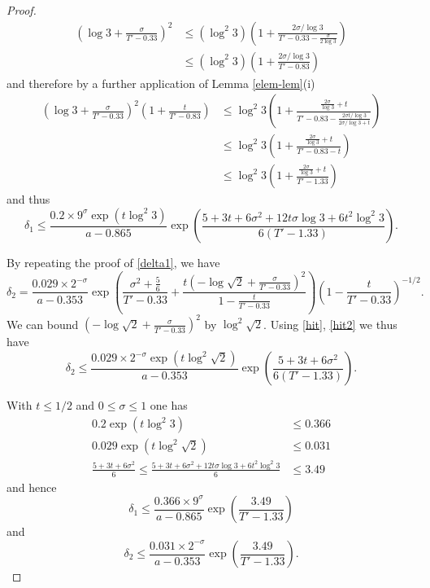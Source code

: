 \begin{proof}
\begin{align*}
\left(\log 3 + \frac{\sigma}{T'-0.33}\right)^2 &\leq (\log^2 3) \left(1 + \frac{2 \sigma / \log 3}{T' - 0.33 - \frac{\sigma}{2\log 3}}\right) \\
&\leq  (\log^2 3) \left(1 + \frac{2 \sigma / \log 3}{T' - 0.83}\right)
\end{align*}
and therefore by a further application of Lemma \ref{elem-lem}(i)
\begin{align*}
\left(\log 3 + \frac{\sigma}{T'-0.33}\right)^2 \left(1 + \frac{t}{T'-0.83}\right) 
&\leq \log^2 3 \left(1 + \frac{\frac{2 \sigma}{\log 3} + t}{T' - 0.83 - \frac{2\sigma t/\log 3}{2\sigma/\log 3 + t}}\right) \\
&\leq \log^2 3 \left(1 + \frac{\frac{2 \sigma}{\log 3} + t}{T' - 0.83 - t}\right) \\
&\leq \log^2 3 \left(1 + \frac{\frac{2 \sigma}{\log 3} + t}{T' - 1.33}\right) 
\end{align*}
and thus
$$ \delta_1 \leq \frac{0.2 \times 9^\sigma \exp( t \log^2 3 )}{a-0.865} \exp\left( \frac{5+3t+6\sigma^2 + 12 t \sigma \log 3 + 6t^2 \log^2 3}{6(T'-1.33)} \right).$$

By repeating the proof of \eqref{delta1}, we have
$$
 \delta_2 = \frac{0.029 \times 2^{-\sigma}}{a - 0.353} \exp\left( \frac{\sigma^2 + \frac{5}{6}}{T'-0.33} + \frac{t\left(-\log \sqrt{2} + \frac{\sigma}{T'-0.33}\right)^2}{1 - \frac{t}{T'-0.33}} \right) \left(1 - \frac{t}{T'-0.33}\right)^{-1/2}.$$
We can bound $(-\log \sqrt{2} + \frac{\sigma}{T'-0.33})^2$ by $\log^2 \sqrt{2}$.  Using \eqref{hit}, \eqref{hit2} we thus have
$$
 \delta_2 \leq \frac{0.029 \times 2^{-\sigma} \exp( t \log^2 \sqrt{2})}{a - 0.353} \exp\left( \frac{5 + 3t + 6\sigma^2}{6(T'-1.33)} \right).
$$

With $t \leq 1/2$ and $0 \leq \sigma \leq 1$ one has
\begin{align*}
 0.2 \exp(t \log^2 3) &\leq 0.366 \\
0.029 \exp( t \log^2 \sqrt{2}) &\leq 0.031 \\
\frac{5 + 3t + 6\sigma^2}{6} \leq \frac{5 + 3t + 6\sigma^2 + 12 t \sigma \log 3 + 6t^2 \log^2 3}{6} &\leq 3.49
\end{align*}
and hence
$$ \delta_1 \leq \frac{0.366 \times 9^\sigma}{a-0.865} \exp\left( \frac{3.49}{T'-1.33} \right)$$
and
$$ \delta_2 \leq \frac{0.031 \times 2^{-\sigma}}{a-0.353} \exp\left( \frac{3.49}{T'-1.33} \right).$$


\end{proof}
